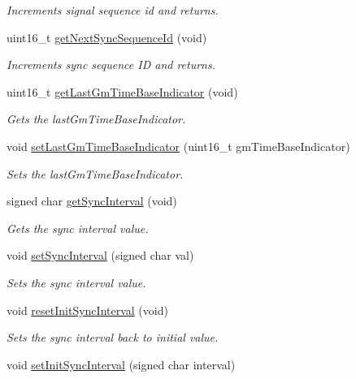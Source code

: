 \begin{DoxyCompactItemize}
\begin{DoxyCompactList}\small\item\em Increments signal sequence id and returns. \end{DoxyCompactList}\item 
uint16\+\_\+t \hyperlink{class_common_port_a05aaa48d87d2fbb2f3c9be81a458119f}{get\+Next\+Sync\+Sequence\+Id} (void)
\begin{DoxyCompactList}\small\item\em Increments sync sequence ID and returns. \end{DoxyCompactList}\item 
uint16\+\_\+t \hyperlink{class_common_port_ab3a3494bfdbdad33855f665c9335ac64}{get\+Last\+Gm\+Time\+Base\+Indicator} (void)
\begin{DoxyCompactList}\small\item\em Gets the last\+Gm\+Time\+Base\+Indicator. \end{DoxyCompactList}\item 
void \hyperlink{class_common_port_a038a307b29400d98300cf0dd1674aa56}{set\+Last\+Gm\+Time\+Base\+Indicator} (uint16\+\_\+t gm\+Time\+Base\+Indicator)
\begin{DoxyCompactList}\small\item\em Sets the last\+Gm\+Time\+Base\+Indicator. \end{DoxyCompactList}\item 
signed char \hyperlink{class_common_port_a963da67f8dd0b8c72bd19ca91c3ce00d}{get\+Sync\+Interval} (void)
\begin{DoxyCompactList}\small\item\em Gets the sync interval value. \end{DoxyCompactList}\item 
void \hyperlink{class_common_port_a0aff2cd89fbc637b4b883a47728f94df}{set\+Sync\+Interval} (signed char val)
\begin{DoxyCompactList}\small\item\em Sets the sync interval value. \end{DoxyCompactList}\item 
void \hyperlink{class_common_port_a7e4b6dfc0822ebebb0874ed2bdd91b10}{reset\+Init\+Sync\+Interval} (void)
\begin{DoxyCompactList}\small\item\em Sets the sync interval back to initial value. \end{DoxyCompactList}\item 
void \hyperlink{class_common_port_a1af3691c565a65c9212b3f0adf1f76ac}{set\+Init\+Sync\+Interval} (signed char interval)

\end{DoxyCompactItemize}
